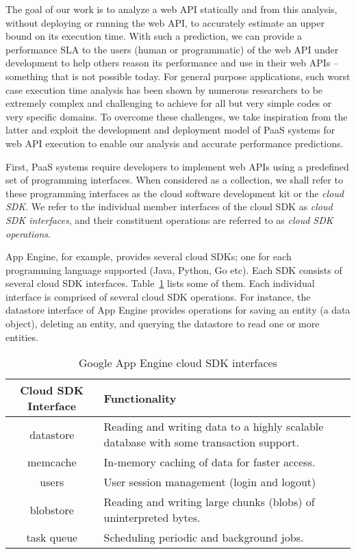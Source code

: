 The goal of our work is to analyze a web API statically and from this analysis, 
without deploying or running the web API, 
to accurately estimate an upper bound on its execution time. With such a prediction,
we can provide a performance SLA to the users (human or 
programmatic) of the web API under development to help others reason its performance
and use in their web APIs -- something that is not possible today.
For general purpose applications, such worst case execution time analysis has been shown
by numerous researchers to be extremely complex and challenging to achieve for all but 
very simple codes or very specific domains.
To overcome these challenges, we take inspiration from the latter and exploit 
the development and deployment model of PaaS systems for web API execution to enable 
our analysis and accurate performance predictions.

First, PaaS systems require developers
to implement web APIs using a predefined set of 
programming interfaces. When considered as a
collection, we shall refer to these programming interfaces as the cloud software development 
kit or the \textit{cloud SDK}. We refer to the individual member interfaces of the cloud SDK
as \textit{cloud SDK interfaces}, and their constituent operations are referred to as \textit{cloud SDK operations}.

App Engine, for example, provides several cloud SDKs; one for each
programming language supported (Java, Python, Go etc). Each SDK consists of
several cloud SDK interfaces. Table~\ref{tab:gae_cloud_sdk} lists some of them.
Each individual interface is comprised of several cloud SDK operations. For instance, the 
datastore interface of App Engine provides operations for saving an entity (a data object),
deleting an entity, and querying the datastore to read one or more entities.

\begin{table}[htdp]
\caption{Google App Engine cloud SDK interfaces}
\begin{center}
\begin{tabular}{|c|p{5cm}|}
\hline
Cloud SDK Interface & Functionality \\ \hline
datastore & Reading and writing data to a highly scalable database with some transaction support. \\ \hline
memcache & In-memory caching of data for faster access.\\ \hline
users & User session management (login and logout)\\ \hline
blobstore & Reading and writing large chunks (blobs) of uninterpreted bytes.\\ \hline
task queue & Scheduling periodic and background jobs.\\ \hline
\end{tabular}
\end{center}
\label{tab:gae_cloud_sdk}
\end{table}

